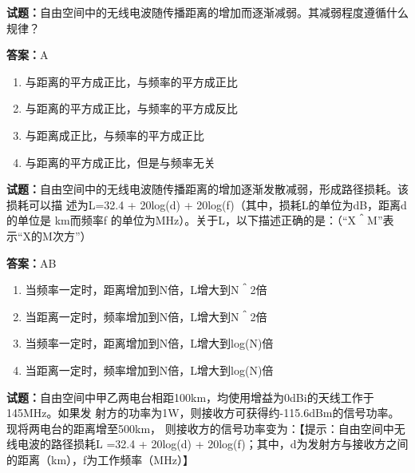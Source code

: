 \documentclass{ctexbook}
\begin{document}
\textbf{试题：}自由空间中的无线电波随传播距离的增加而逐渐减弱。其减弱程度遵循什么规律？ 

\textbf{答案：}A 

\begin{enumerate}[leftmargin=3em]
  \item 与距离的平方成正比，与频率的平方成正比 

  \item 与距离的平方成正比，与频率的平方成反比 

  \item 与距离成正比，与频率的平方成正比 

  \item 与距离的平方成正比，但是与频率无关 

\end{enumerate}





\vspace{1em}

\textbf{试题：}自由空间中的无线电波随传播距离的增加逐渐发散减弱，形成路径损耗。该损耗可以描
述为L=32.4 + 20log(d) + 20log(f)（其中，损耗L的单位为dB，距离d的单位是 km而频率f
的单位为MHz）。关于L，以下描述正确的是：（“X＾M”表示“X的M次方”） 

\textbf{答案：}AB 

\begin{enumerate}[leftmargin=3em]
  \item 当频率一定时，距离增加到N倍，L增大到N＾2倍 

  \item 当距离一定时，频率增加到N倍，L增大到N＾2倍 

  \item 当频率一定时，距离增加到N倍，L增大到log(N)倍 

  \item 当距离一定时，频率增加到N倍，L增大到log(N)倍 

\end{enumerate}





\vspace{1em}

\textbf{试题：}自由空间中甲乙两电台相距100km，均使用增益为0dBi的天线工作于145MHz。如果发
射方的功率为1W，则接收方可获得约-115.6dBm的信号功率。现将两电台的距离增至500km，
则接收方的信号功率变为：【提示：自由空间中无线电波的路径损耗L =32.4 + 20log(d) + 
20log(f)；其中，d为发射方与接收方之间的距离（km），f为工作频率（MHz）】 
\end{document}
